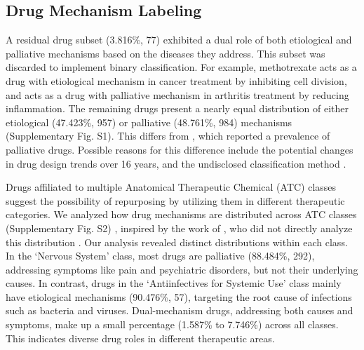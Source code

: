 \documentclass[journal,twoside,web]{ieeecolor}
\begin{document}
\subsection{Drug Mechanism Labeling}
A residual drug subset (3.816\%, 77) exhibited a dual role of both etiological and palliative mechanisms based on the diseases they address.
This subset was discarded to implement binary classification.
For example, methotrexate acts as a drug with etiological mechanism in cancer treatment by inhibiting cell division, and acts as a drug with palliative mechanism in arthritis treatment by reducing inflammation.
The remaining drugs present a nearly equal distribution of either etiological (47.423\%, 957) or palliative (48.761\%, 984) mechanisms (Supplementary Fig. S1). %
This differs from \cite{yildirim2007drug}, which reported a prevalence of palliative drugs.
Possible reasons for this difference include the potential changes in drug design trends over 16 years, and the undisclosed classification method \cite{yildirim2007drug}.


Drugs affiliated to multiple Anatomical Therapeutic Chemical (ATC) classes suggest the possibility of repurposing by utilizing them in different therapeutic categories.
We analyzed how drug mechanisms are distributed across ATC classes (Supplementary Fig. S2)%
, inspired by the work of \cite{yildirim2007drug}, who did not directly analyze this distribution \cite[Figure~2]{yildirim2007drug}.
Our analysis revealed distinct distributions within each class.
In the `Nervous System' class, most drugs are palliative (88.484\%, 292), addressing symptoms like pain and psychiatric disorders, but not their underlying causes.
In contrast, drugs in the `Antiinfectives for Systemic Use' class mainly have etiological mechanisms (90.476\%, 57), targeting the root cause of infections such as bacteria and viruses.
Dual-mechanism drugs, addressing both causes and symptoms, make up a small percentage (1.587\% to 7.746\%) across all classes.
This indicates diverse drug roles in different therapeutic areas.

\end{document}
